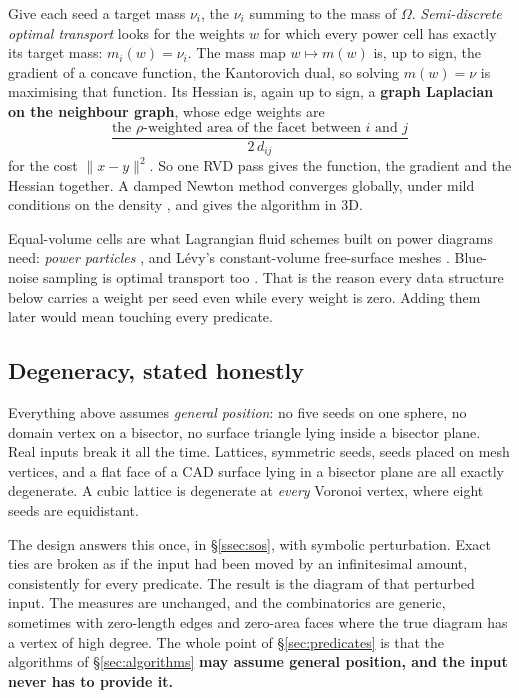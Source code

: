 \documentclass[11pt,a4paper]{article}
\newcommand{\norm}[1]{\lVert #1\rVert}
\newcommand{\secref}[1]{\S\ref{#1}}
\begin{document}
Give each seed a target mass $\nu_i$, the $\nu_i$ summing to the mass of $\Omega$.
\emph{Semi-discrete optimal transport} looks for the weights $w$ for which every power cell has
exactly its target mass: $m_i(w) = \nu_i$. The mass map $w \mapsto m(w)$ is, up to sign, the
gradient of a concave function, the Kantorovich dual, so solving $m(w) = \nu$ is maximising that
function. Its Hessian is, again up to sign, a \textbf{graph Laplacian on the neighbour graph},
whose edge weights are
\[
  \frac{\text{the $\rho$-weighted area of the facet between $i$ and $j$}}{2\,d_{ij}}
\]
for the cost $\norm{x-y}^2$. So one RVD pass gives the function, the gradient and the Hessian
together. A damped Newton method converges globally, under mild conditions on the density
\citep{kitagawa2019}, and \citet{levy2015} gives the algorithm in 3D.

Equal-volume cells are what Lagrangian fluid schemes built on power diagrams need: \emph{power
particles} \citep{degoes2015}, and Lévy's constant-volume free-surface meshes
\citep{levy2022}. Blue-noise sampling is optimal transport too \citep{degoes2012}. That is the
reason every data structure below carries a weight per seed even while every weight is zero.
Adding them later would mean touching every predicate.

\subsection{Degeneracy, stated honestly}\label{ssec:degeneracy}

Everything above assumes \emph{general position}: no five seeds on one sphere, no domain vertex
on a bisector, no surface triangle lying inside a bisector plane. Real inputs break it all the
time. Lattices, symmetric seeds, seeds placed on mesh vertices, and a flat face of a CAD surface
lying in a bisector plane are all exactly degenerate. A cubic lattice is degenerate at
\emph{every} Voronoi vertex, where eight seeds are equidistant.

The design answers this once, in \secref{ssec:sos}, with symbolic perturbation. Exact ties are
broken as if the input had been moved by an infinitesimal amount, consistently for every
predicate. The result is the diagram of that perturbed input. The measures are unchanged, and
the combinatorics are generic, sometimes with zero-length edges and zero-area faces where the
true diagram has a vertex of high degree. The whole point of \secref{sec:predicates} is that the
algorithms of \secref{sec:algorithms} \textbf{may assume general position, and the input never
has to provide it.}
\end{document}
